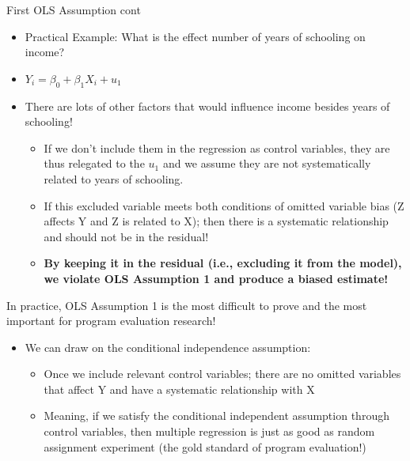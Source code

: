 \documentclass[8pt,ignorenonframetext,dvipsnames]{beamer}
\providecommand{\tightlist}{%
  \setlength{\itemsep}{0pt}\setlength{\parskip}{0pt}}
\renewcommand{\textbf}[1]{{\color{darkgray}\bfseries\fontfamily{Montserrat-TOsF}#1}}
\let\olditem\item
\renewcommand{\item}{%
  \olditem\vspace{4pt}
}
\begin{document}
\begin{frame}{First OLS Assumption cont}
\protect\hypertarget{first-ols-assumption-cont}{}

\begin{itemize}
\tightlist
\item
  Practical Example: What is the effect number of years of schooling on
  income?
\item
  \(Y_i = \beta_0 + \beta_1X_i +u_1\)
\item
  There are lots of other factors that would influence income besides
  years of schooling!

  \begin{itemize}
  \tightlist
  \item
    If we don't include them in the regression as control variables,
    they are thus relegated to the \(u_1\) and we assume they are not
    systematically related to years of schooling.
  \item
    If this excluded variable meets both conditions of omitted variable
    bias (Z affects Y and Z is related to X); then there is a systematic
    relationship and should not be in the residual!
  \item
    \textbf{By keeping it in the residual (i.e., excluding it from the
    model), we violate OLS Assumption 1 and produce a biased estimate!}
  \end{itemize}
\end{itemize}

\medskip

In practice, OLS Assumption 1 is the most difficult to prove and the
most important for program evaluation research!

\begin{itemize}
\tightlist
\item
  We can draw on the conditional independence assumption:

  \begin{itemize}
  \tightlist
  \item
    Once we include relevant control variables; there are no omitted
    variables that affect Y and have a systematic relationship with X
  \item
    Meaning, if we satisfy the conditional independent assumption
    through control variables, then multiple regression is just as good
    as random assignment experiment (the gold standard of program
    evaluation!)
  \end{itemize}
\end{itemize}

\end{frame}
\end{document}
